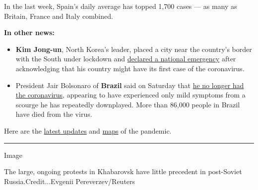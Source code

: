 In the last week, Spain's daily average has topped 1,700 cases --- as
many as Britain, France and Italy combined.

\textbf{In other news:}

\begin{itemize}
\item
  \textbf{Kim Jong-un}, North Korea's leader, placed a city near the
  country's border with the South under lockdown and
  \href{https://www.nytimes.com/2020/07/25/world/asia/north-korea-coronavirus-kim-jong-un.html}{declared
  a national emergency} after acknowledging that his country might have
  its first case of the coronavirus.
\item
  President Jair Bolsonaro of \textbf{Brazil} said on Saturday that
  \href{https://www.nytimes.com/2020/07/25/world/americas/bolsonaro-coronavirus.html}{he
  no longer had the coronavirus}, appearing to have experienced only
  mild symptoms from a scourge he has repeatedly downplayed. More than
  86,000 people in Brazil have died from the virus.
\end{itemize}

Here are the
\href{https://nl.nytimes.com/f/newsletter/TEd7jYCzIJAEgTIonGldBQ~~/AAAAAQA~/RgRhAHRdP4QiAWh0dHBzOi8vd3d3Lm55dGltZXMuY29tLzIwMjAvMDcvMjYvd29ybGQvY29yb25hdmlydXMtbGl2ZS11cGRhdGVzLmh0bWw_YWN0aW9uPWNsaWNrJmNhbXBhaWduX2lkPTcmZW1jPWVkaXRfTUJBRV9wXzIwMjAwNzI2Jmluc3RhbmNlX2lkPTIwNjM3Jm1vZHVsZT1Ub3ArU3RvcmllcyZubD1tb3JuaW5nLWJyaWVmaW5nJnBndHlwZT1Ib21lcGFnZSZyZWdpX2lkPTI2MDkzMzUmc2VjdGlvbj10b3BOZXdzJnNlZ21lbnRfaWQ9MzQ0MjEmdGU9MSZ1c2VyX2lkPTdiMDVmNmVmM2JhYjJhODhmODQ4YWUxMDc0NzE0MGM5VwNueXRCCgAqXe8dXwOQ9pNSFHNpZGFja2VyQG55dGltZXMuY29tWAQAAAAA}{latest
updates} and
\href{https://nl.nytimes.com/f/a/JuocS582l3qnDzqenzh8Ow~~/AAAAAQA~/RgRhAHRdP0TwaHR0cHM6Ly93d3cubnl0aW1lcy5jb20vaW50ZXJhY3RpdmUvMjAyMC93b3JsZC9jb3JvbmF2aXJ1cy1tYXBzLmh0bWw_Y2FtcGFpZ25faWQ9NyZlbWM9ZWRpdF9NQkFFX3BfMjAyMDA3MjYmaW5zdGFuY2VfaWQ9MjA2Mzcmbmw9bW9ybmluZy1icmllZmluZyZyZWdpX2lkPTI2MDkzMzUmc2VjdGlvbj10b3BOZXdzJnNlZ21lbnRfaWQ9MzQ0MjEmdGU9MSZ1c2VyX2lkPTdiMDVmNmVmM2JhYjJhODhmODQ4YWUxMDc0NzE0MGM5VwNueXRCCgAqXe8dXwOQ9pNSFHNpZGFja2VyQG55dGltZXMuY29tWAQAAAAA}{maps}
of the pandemic.

\begin{center}\rule{0.5\linewidth}{\linethickness}\end{center}

Image

The large, ongoing protests in Khabarovsk have little precedent in
post-Soviet Russia.Credit...Evgenii Pereverzev/Reuters

